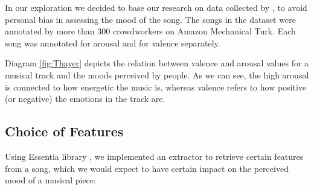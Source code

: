 In our exploration we decided to base our research on data collected by \cite{1000songs}, to avoid personal bias in assessing the mood of the song. The songs in the dataset were annotated by more than 300 crowdworkers on Amazon Mechanical Turk. Each song was annotated for arousal and for valence separately.


Diagram \ref{fig:Thayer} depicts the relation between valence and arousal values for a musical track and the moods perceived by people. As we can see, the high arousal is connected to how energetic the music is, whereas valence refers to how positive (or negative) the emotions in the track are. 

\vspace{10pt}

\subsection{Choice of Features}
Using Essentia library \cite{essentia}, we implemented an extractor to retrieve certain features from a song, which we would expect to have certain impact on the perceived mood of a musical piece:
